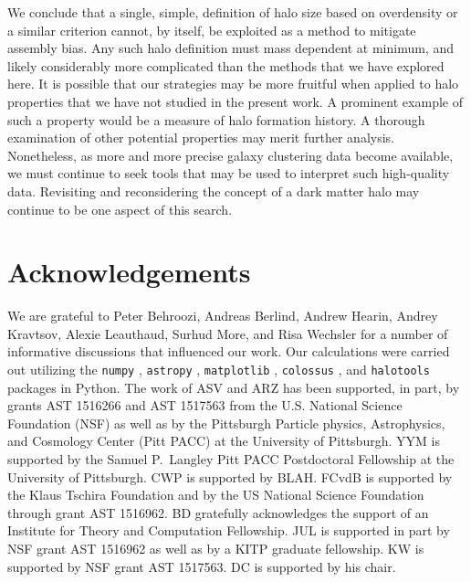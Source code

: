 \documentclass[usenatbib,fleqn]{mnras}
\begin{document}
We conclude that a single, simple, definition of halo size based on overdensity or a similar criterion cannot, by itself, be exploited as a method to mitigate assembly bias. Any such halo definition must mass dependent at minimum, and likely considerably more complicated than the methods that we have explored here. It is possible that our strategies may be more fruitful when applied to halo properties that we have not studied in the present work. A prominent example of such a property would be a measure of halo formation history. A thorough examination of other potential properties may merit further analysis. Nonetheless, as more and more precise galaxy clustering data become available, we must continue to seek tools that may be used to interpret such high-quality data. Revisiting and reconsidering the concept of a dark matter halo may continue to be one aspect of this search.

\section*{Acknowledgements}

We are grateful to Peter Behroozi, Andreas Berlind, Andrew Hearin, Andrey Kravtsov, Alexie Leauthaud, Surhud More, and Risa Wechsler for a number of informative discussions that influenced our work. Our calculations were carried out utilizing the {\tt numpy} \citep{numpy}, {\tt astropy} \citep{astropy}, {\tt matplotlib} \citep{matplotlib}, {\tt colossus} \citep{diemer_kravtsov15}, and {\tt halotools} \citep{halotools} packages in Python. The work of ASV and ARZ has been supported, in part, by grants AST 1516266 and AST 1517563 from the U.S. National Science Foundation (NSF) as well as by the Pittsburgh Particle physics, Astrophysics, and Cosmology Center (Pitt PACC) at the University of Pittsburgh. YYM is supported by the Samuel P.\ Langley Pitt PACC Postdoctoral Fellowship at the University of Pittsburgh. CWP is supported by BLAH. FCvdB is supported by the Klaus Tschira Foundation and by the US National Science Foundation through grant AST 1516962. BD gratefully acknowledges the support of an Institute for Theory and Computation Fellowship. JUL is supported in part by NSF grant AST 1516962 as well as by a KITP graduate fellowship. KW is supported by NSF grant AST 1517563. DC is supported by his chair.




\label{lastpage}
\end{document}
